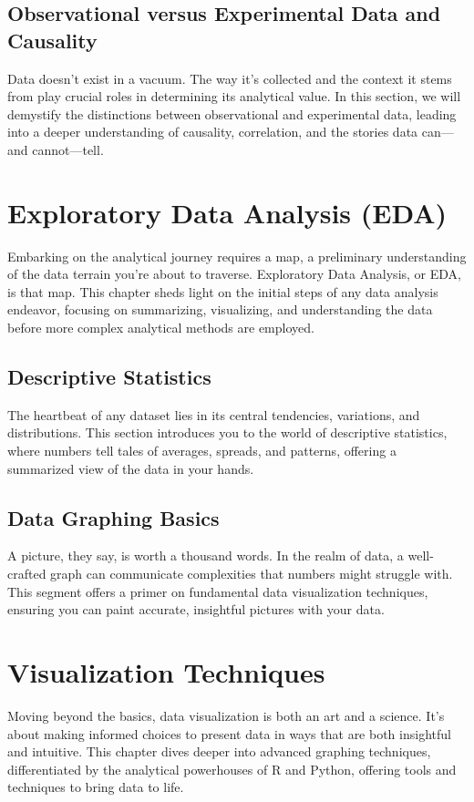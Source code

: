 \documentclass{book}
\begin{document}
\section{Observational versus Experimental Data and Causality}
Data doesn't exist in a vacuum. The way it's collected and the context it stems from play crucial roles in determining its analytical value. In this section, we will demystify the distinctions between observational and experimental data, leading into a deeper understanding of causality, correlation, and the stories data can—and cannot—tell.

\chapter{Exploratory Data Analysis (EDA)}
Embarking on the analytical journey requires a map, a preliminary understanding of the data terrain you're about to traverse. Exploratory Data Analysis, or EDA, is that map. This chapter sheds light on the initial steps of any data analysis endeavor, focusing on summarizing, visualizing, and understanding the data before more complex analytical methods are employed.

\section{Descriptive Statistics}
The heartbeat of any dataset lies in its central tendencies, variations, and distributions. This section introduces you to the world of descriptive statistics, where numbers tell tales of averages, spreads, and patterns, offering a summarized view of the data in your hands.

\section{Data Graphing Basics}
A picture, they say, is worth a thousand words. In the realm of data, a well-crafted graph can communicate complexities that numbers might struggle with. This segment offers a primer on fundamental data visualization techniques, ensuring you can paint accurate, insightful pictures with your data.

\chapter{Visualization Techniques}
Moving beyond the basics, data visualization is both an art and a science. It's about making informed choices to present data in ways that are both insightful and intuitive. This chapter dives deeper into advanced graphing techniques, differentiated by the analytical powerhouses of R and Python, offering tools and techniques to bring data to life.
\end{document}
